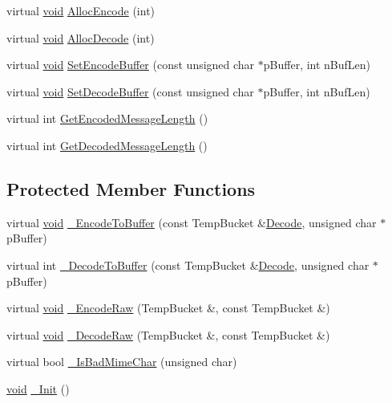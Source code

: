 \begin{DoxyCompactItemize}
\item 
virtual \hyperlink{_cpclient_8h_a6464f7480a0fd0ee170cba12b2c0497f}{void} \hyperlink{class_base64_coder_a011aa925b194f82968922b4b3dcff3b8}{\-Alloc\-Encode} (int)
\item 
virtual \hyperlink{_cpclient_8h_a6464f7480a0fd0ee170cba12b2c0497f}{void} \hyperlink{class_base64_coder_a1af7910063d69c2062b10e28450b24aa}{\-Alloc\-Decode} (int)
\item 
virtual \hyperlink{_cpclient_8h_a6464f7480a0fd0ee170cba12b2c0497f}{void} \hyperlink{class_base64_coder_a7d519beb341591333bb9ec208e38ec90}{\-Set\-Encode\-Buffer} (const unsigned char $\ast$p\-Buffer, int n\-Buf\-Len)
\item 
virtual \hyperlink{_cpclient_8h_a6464f7480a0fd0ee170cba12b2c0497f}{void} \hyperlink{class_base64_coder_a7b35eab965e2047acf8eb0741b164f06}{\-Set\-Decode\-Buffer} (const unsigned char $\ast$p\-Buffer, int n\-Buf\-Len)
\item 
virtual int \hyperlink{class_base64_coder_adcbf12bb740d6fd4833fd11228ce1735}{\-Get\-Encoded\-Message\-Length} ()
\item 
virtual int \hyperlink{class_base64_coder_ad909c6b09dbdf59e4b420fac61ea7376}{\-Get\-Decoded\-Message\-Length} ()
\end{DoxyCompactItemize}
\subsection*{\-Protected \-Member \-Functions}
\begin{DoxyCompactItemize}
\item 
virtual \hyperlink{_cpclient_8h_a6464f7480a0fd0ee170cba12b2c0497f}{void} \hyperlink{class_base64_coder_a0fc2eb33c2601a43e1d99acd46ce73ab}{\-\_\-\-Encode\-To\-Buffer} (const \-Temp\-Bucket \&\hyperlink{class_base64_coder_a04b9debcf2cb14ed762163516ab490e7}{\-Decode}, unsigned char $\ast$p\-Buffer)
\item 
virtual int \hyperlink{class_base64_coder_ace37dfbbc4e34bacf42682b6bbaffc2d}{\-\_\-\-Decode\-To\-Buffer} (const \-Temp\-Bucket \&\hyperlink{class_base64_coder_a04b9debcf2cb14ed762163516ab490e7}{\-Decode}, unsigned char $\ast$p\-Buffer)
\item 
virtual \hyperlink{_cpclient_8h_a6464f7480a0fd0ee170cba12b2c0497f}{void} \hyperlink{class_base64_coder_af997d322ce88184b7c2592528bd55a21}{\-\_\-\-Encode\-Raw} (\-Temp\-Bucket \&, const \-Temp\-Bucket \&)
\item 
virtual \hyperlink{_cpclient_8h_a6464f7480a0fd0ee170cba12b2c0497f}{void} \hyperlink{class_base64_coder_a38d1d903a1d5f0063834fc293d2187f2}{\-\_\-\-Decode\-Raw} (\-Temp\-Bucket \&, const \-Temp\-Bucket \&)
\item 
virtual bool \hyperlink{class_base64_coder_a8feb3708d843ce51427d4a7b1e758200}{\-\_\-\-Is\-Bad\-Mime\-Char} (unsigned char)
\item 
\hyperlink{_cpclient_8h_a6464f7480a0fd0ee170cba12b2c0497f}{void} \hyperlink{class_base64_coder_ac0ccfdaba7db7e5a1a53489ae339bfeb}{\-\_\-\-Init} ()
\end{DoxyCompactItemize}
